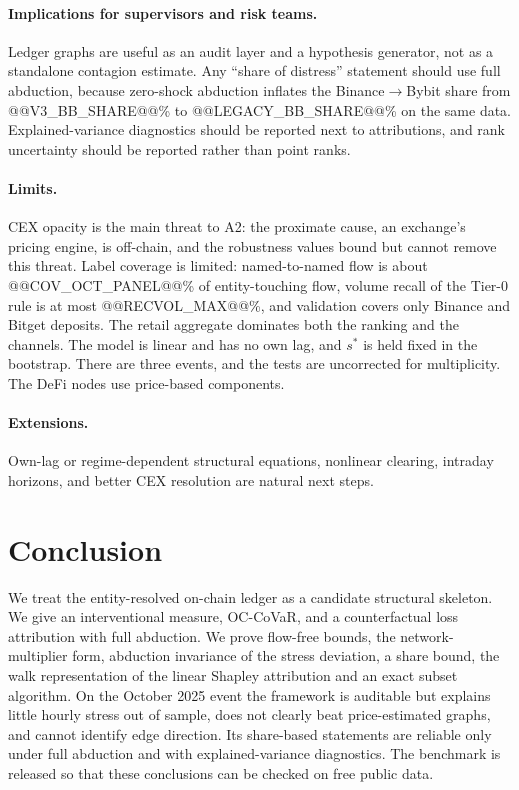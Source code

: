 \documentclass[referee,pdflatex,sn-mathphys-ay]{sn-jnl}
\theoremstyle{thmstyleone}%
\theoremstyle{thmstyletwo}%
\theoremstyle{thmstylethree}%
\begin{document}
\paragraph{Implications for supervisors and risk teams.} Ledger graphs are useful as an audit layer and a hypothesis generator, not as a
standalone contagion estimate. Any ``share of distress'' statement should use full abduction, because zero-shock abduction inflates
the Binance$\to$Bybit share from @@V3_BB_SHARE@@\% to @@LEGACY_BB_SHARE@@\% on the same data. Explained-variance diagnostics should be
reported next to attributions, and rank uncertainty should be reported rather than point ranks.

\paragraph{Limits.} CEX opacity is the main threat to A2: the proximate cause, an exchange's pricing engine, is off-chain, and the
robustness values bound but cannot remove this threat. Label coverage is limited: named-to-named flow is about @@COV_OCT_PANEL@@\% of
entity-touching flow, volume recall of the Tier-0 rule is at most @@RECVOL_MAX@@\%, and validation covers only Binance and Bitget deposits.
The retail aggregate dominates both the ranking and the channels. The model is linear and has no own lag, and $s^\ast$ is held fixed
in the bootstrap. There are three events, and the tests are uncorrected for multiplicity. The DeFi nodes use price-based components.

\paragraph{Extensions.} Own-lag or regime-dependent structural equations, nonlinear clearing, intraday horizons, and better CEX resolution
are natural next steps.

\section{Conclusion}
\label{sec:conclusion}
We treat the entity-resolved on-chain ledger as a candidate structural skeleton. We give an interventional measure, OC-CoVaR, and a
counterfactual loss attribution with full abduction. We prove flow-free bounds, the network-multiplier form, abduction invariance of
the stress deviation, a share bound, the walk representation of the linear Shapley attribution and an exact subset algorithm. On the
October 2025 event the framework is auditable but explains little hourly stress out of sample, does not clearly beat price-estimated
graphs, and cannot identify edge direction. Its share-based statements are reliable only under full abduction and with
explained-variance diagnostics. The benchmark is released so that these conclusions can be checked on free public data.
\end{document}
